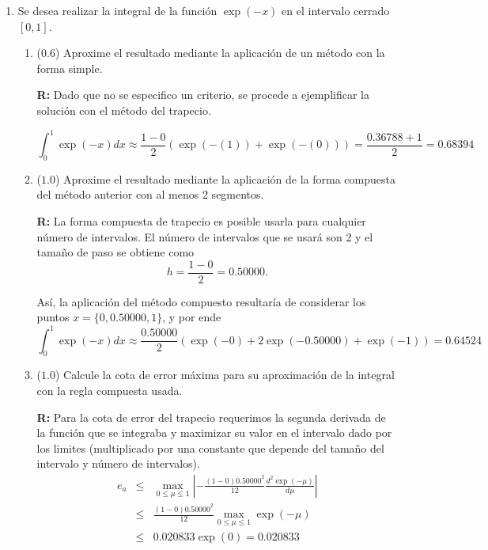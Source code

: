 \documentclass[12pt]{article}
\begin{document}
\vspace{-.5cm}
  \begin{enumerate}[leftmargin=*,widest=9]

    \item Se desea realizar la integral de la función \(\exp(-x)\) en el intervalo cerrado \(\left[0, 1\right]\).

    \begin{enumerate}[label=\alph*]
    \item (\(0.6\)) Aproxime el resultado mediante la aplicación de un método con la forma simple.

		\textbf{R:} Dado que no se especifico un criterio, se procede a ejemplificar la solución con el método del trapecio.

    \[
    \int_{0}^{1}\exp(-x)dx \approx \frac{1-0}{2}(\exp(-(1)) + \exp(-(0)))=\frac{0.36788 + 1}{2}=0.68394
    \]

    \item (\(1.0\)) Aproxime el resultado mediante la aplicación de la forma compuesta del método anterior con al menos 2 segmentos.

		\textbf{R:} La forma compuesta de trapecio es posible usarla para cualquier número de intervalos. El número de intervalos que se usará son 2 y el tamaño de paso se obtiene como
    \[
    h = \frac{1-0}{2} = 0.50000.
    \]

    Así, la aplicación del método compuesto resultaría de considerar los puntos \( x=\lbrace 0, 0.50000, 1 \rbrace \), y por ende
    \[
    \int_{0}^{1}\exp(-x)dx \approx \frac{0.50000}{2}(\exp(-0)+2\exp(-0.50000)+\exp(-1))=0.64524
    \]

    \item (\(1.0\)) Calcule la cota de error máxima para su aproximación de la integral con la regla compuesta usada.

		\textbf{R:} Para la cota de error del trapecio requerimos la segunda derivada de la función que se integraba y maximizar su valor en el intervalo dado por los limites (multiplicado por una constante que depende del tamaño del intervalo y número de intervalos).
    \begin{eqnarray*}
e_a &\leq& \max_{0\leq\mu\leq 1}\left\vert -\frac{(1-0)0.50000^2}{12} \frac{d^2\exp(-\mu)}{d\mu} \right\vert \\
& \leq& \frac{(1-0)0.50000^2}{12}\max_{0\leq\mu\leq 1}\exp(-\mu) \\
&\leq & 0.020833 \exp(0) = 0.020833
    \end{eqnarray*}


\end{enumerate}
\end{enumerate}
\end{document}
